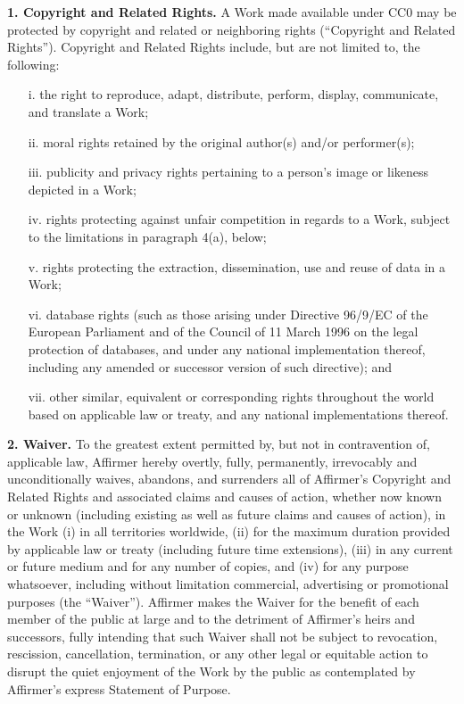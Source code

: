 \documentclass[letterpaper,twocolumn,10pt,openany,oneside,final,fleqn]{memoir}
\begin{document}
\textbf{1. Copyright and Related Rights.} A Work made available under CC0 may be
protected by copyright and related or neighboring rights (``Copyright and
Related Rights''). Copyright and Related Rights include, but are not
limited to, the following:

\begin{itemize}
\item[i.]{the right to reproduce, adapt, distribute, perform, display,
     communicate, and translate a Work;}
\item[ii.]{ moral rights retained by the original author(s) and/or performer(s);}
\item[iii.]{publicity and privacy rights pertaining to a person's image or
     likeness depicted in a Work;}
\item[iv.]{rights protecting against unfair competition in regards to a Work,
     subject to the limitations in paragraph 4(a), below;}
\item[v.]{ rights protecting the extraction, dissemination, use and reuse of data
     in a Work;}
\item[vi.]{database rights (such as those arising under Directive 96/9/EC of the
     European Parliament and of the Council of 11 March 1996 on the legal
     protection of databases, and under any national implementation
     thereof, including any amended or successor version of such
     directive); and}
\item[vii.]{other similar, equivalent or corresponding rights throughout the
     world based on applicable law or treaty, and any national
     implementations thereof.}
\end{itemize}

\textbf{2. Waiver.} To the greatest extent permitted by, but not in contravention
of, applicable law, Affirmer hereby overtly, fully, permanently,
irrevocably and unconditionally waives, abandons, and surrenders all of
Affirmer's Copyright and Related Rights and associated claims and causes
of action, whether now known or unknown (including existing as well as
future claims and causes of action), in the Work (i) in all territories
worldwide, (ii) for the maximum duration provided by applicable law or
treaty (including future time extensions), (iii) in any current or future
medium and for any number of copies, and (iv) for any purpose whatsoever,
including without limitation commercial, advertising or promotional
purposes (the ``Waiver''). Affirmer makes the Waiver for the benefit of each
member of the public at large and to the detriment of Affirmer's heirs and
successors, fully intending that such Waiver shall not be subject to
revocation, rescission, cancellation, termination, or any other legal or
equitable action to disrupt the quiet enjoyment of the Work by the public
as contemplated by Affirmer's express Statement of Purpose.
\end{document}
